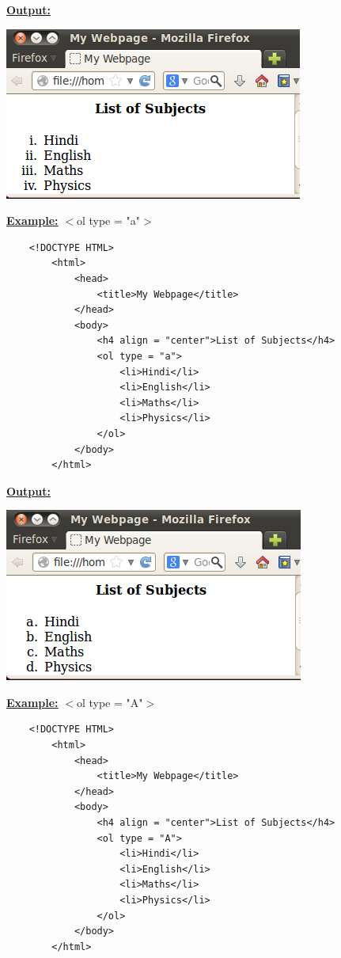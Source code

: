 \documentclass[11pt,a4paper]{article}
\begin{document}
\begin{description}
\underline{\textbf{Output:}}\

\includegraphics[scale=0.7]{OL2.png}\

\underline{\textbf{Example:}} $<$ol type = "a"$>$
\begin{verbatim}
    <!DOCTYPE HTML>
        <html>
            <head>
                <title>My Webpage</title>
            </head>
            <body>
                <h4 align = "center">List of Subjects</h4>
                <ol type = "a">
                    <li>Hindi</li>
                    <li>English</li>
                    <li>Maths</li>
                    <li>Physics</li>
                </ol>
            </body>
        </html>
\end{verbatim}

\underline{\textbf{Output:}}\

\includegraphics[scale=0.7]{OL3.png}\

\underline{\textbf{Example:}} $<$ol type = "A"$>$
\begin{verbatim}
    <!DOCTYPE HTML>
        <html>
            <head>
                <title>My Webpage</title>
            </head>
            <body>
                <h4 align = "center">List of Subjects</h4>
                <ol type = "A">
                    <li>Hindi</li>
                    <li>English</li>
                    <li>Maths</li>
                    <li>Physics</li>
                </ol>
            </body>
        </html>
\end{verbatim}


\end{description}
\end{document}

